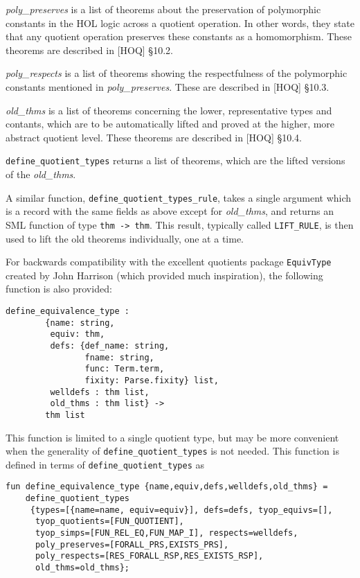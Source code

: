 {\it poly\_preserves\/} is a list of theorems about the preservation of
polymorphic constants in the HOL logic
across a quotient operation.
In other words, they state that any quotient operation preserves these
constants as a homomorphism.
These theorems are described in
[HOQ] \S 10.2.

{\it poly\_respects\/} is a list of theorems showing the respectfulness
of the polymorphic constants mentioned in {\it poly\_preserves}.
These are
described in
[HOQ] \S 10.3.

{\it old\_thms\/} is a list of theorems concerning the lower, representative
types and contants, which are to be automatically lifted and proved at the
higher, more abstract quotient level.
These theorems are described in
[HOQ] \S 10.4.

{\tt define\_quotient\_types} returns a list of theorems, which are the
lifted versions of the {\it old\_thms}.

A similar function,
{\tt define\_quotient\_types\_rule}, takes a single argument which is a
record with the same fields as above except for {\it old\_thms},
and returns an SML function of type {\tt thm -> thm}.
This result, typically called {\tt LIFT\_RULE},
is then used to lift the old theorems individually, one at a time.

For backwards compatibility with
the excellent quotients package
{\tt EquivType}
created by
John Harrison
(which provided much inspiration),
the following function is also provided:

\begin{verbatim}
define_equivalence_type :
        {name: string,
         equiv: thm,
         defs: {def_name: string,
                fname: string,
                func: Term.term,
                fixity: Parse.fixity} list,
         welldefs : thm list,
         old_thms : thm list} ->
        thm list
\end{verbatim}

\noindent
This function is limited to a single quotient type, but may be
more convenient when the generality of {\tt define\_quotient\_types}
is not needed.
This function is defined in terms of {\tt define\_quotient\_types} as

\begin{verbatim}
fun define_equivalence_type {name,equiv,defs,welldefs,old_thms} =
    define_quotient_types
     {types=[{name=name, equiv=equiv}], defs=defs, tyop_equivs=[],
      tyop_quotients=[FUN_QUOTIENT],
      tyop_simps=[FUN_REL_EQ,FUN_MAP_I], respects=welldefs,
      poly_preserves=[FORALL_PRS,EXISTS_PRS],
      poly_respects=[RES_FORALL_RSP,RES_EXISTS_RSP],
      old_thms=old_thms};
\end{verbatim}


